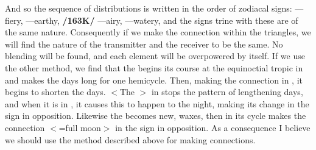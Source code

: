 And so the sequence of distributions is written in the order of zodiacal signs: \Aries—fiery, \Taurus—earthy, \textbf{/163K/} \Gemini—airy, \Cancer—watery, and the signs trine with these are of the same nature. Consequently if we make the connection within the triangles, we will find the nature of the transmitter and the receiver to be the same. No blending will be found, and each element will be overpowered by itself. If we use the other method, we find that the \Sun\xspace begins its course at the equinoctial tropic in \Aries\xspace and makes the days long for one hemicycle. Then, making the connection in \Libra, it begins to shorten the days. $<$The \Sun$>$ in \Cancer\xspace stops the pattern of lengthening days, and when it is in \Capricorn, it causes this to happen to the night, making its change in the sign in opposition. Likewise the \Moon\xspace becomes new, waxes, then in its cycle makes the connection $<$=full moon$>$ in the sign in opposition. As a
consequence I believe we should use the method described above for making connections.


\newpage